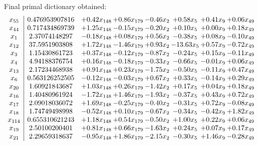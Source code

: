 \documentclass[8pt]{article}
\begin{document}
 Final primal dictionary obtained: 
\[\begin{array}{c| c c@{\hskip 2pt} c@{\hskip 2pt} c@{\hskip 2pt} c@{\hskip 2pt} c@{\hskip 2pt} c@{\hskip 2pt} }
 x_{55}   &  0.476953907816 & +  0.42 x_{148} & +  0.86 x_{179} & -0.46 x_{2} & +  0.58 x_{5} & +  0.41 x_{9} & +  0.06 x_{49}\\
 x_{44}   &  0.717434869739 & +  1.25 x_{148} & -0.15 x_{179} & -0.20 x_{2} & +  0.10 x_{5} & +  0.00 x_{9} & +  0.18 x_{49}\\
 x_{1}   &  2.37074148297 & -0.18 x_{148} & +  0.08 x_{179} & +  0.56 x_{2} & -0.38 x_{5} & +  0.08 x_{9} & -0.10 x_{49}\\
 x_{12}   &  37.5951903808 & +  1.72 x_{148} & -1.46 x_{179} & +  0.93 x_{2} & -13.63 x_{5} & +  0.57 x_{9} & -0.72 x_{49}\\
 x_{3}   &  1.15430861723 & +  0.37 x_{148} & -0.12 x_{179} & -0.87 x_{2} & -0.24 x_{5} & +  0.15 x_{9} & -0.11 x_{49}\\
 x_{4}   &  4.94188376754 & +  0.16 x_{148} & -0.18 x_{179} & -0.33 x_{2} & -0.66 x_{5} & -0.01 x_{9} & +  0.06 x_{49}\\
 x_{13}   &  2.17234468938 & +  0.91 x_{148} & +  0.23 x_{179} & -1.75 x_{2} & -0.50 x_{5} & -0.11 x_{9} & +  0.47 x_{49}\\
 x_{6}   &  0.563126252505 & -0.12 x_{148} & -0.03 x_{179} & +  0.67 x_{2} & +  0.33 x_{5} & -0.14 x_{9} & +  0.29 x_{49}\\
 x_{20}   &  1.60921843687 & +  1.03 x_{148} & +  0.26 x_{179} & -1.42 x_{2} & +  0.17 x_{5} & +  0.04 x_{9} & +  0.18 x_{49}\\
 x_{16}   &  1.40480961924 & -1.72 x_{148} & +  1.46 x_{179} & -1.93 x_{2} & -0.37 x_{5} & +  0.43 x_{9} & +  0.72 x_{49}\\
 x_{17}   &  2.09018036072 & +  1.69 x_{148} & -0.25 x_{179} & -0.40 x_{2} & -0.31 x_{5} & +  0.72 x_{9} & -0.08 x_{49}\\
 x_{18}   &  1.74749498998 & -0.52 x_{148} & +  0.10 x_{179} & -0.67 x_{2} & -0.34 x_{5} & -0.42 x_{9} & +  1.82 x_{49}\\
 x_{114}   &  0.655310621243 & +  1.18 x_{148} & +  0.54 x_{179} & -0.50 x_{2} & +  1.00 x_{5} & +  0.22 x_{9} & +  0.06 x_{49}\\
 x_{19}   &  2.50100200401 & +  0.81 x_{148} & +  0.66 x_{179} & -1.63 x_{2} & +  0.24 x_{5} & +  0.07 x_{9} & +  0.17 x_{49}\\
 x_{21}   &  2.29659318637 & -0.95 x_{148} & +  1.86 x_{179} & -2.15 x_{2} & -0.30 x_{5} & +  1.46 x_{9} & -0.28 x_{49}\\

\end{array}\]
\end{document}
